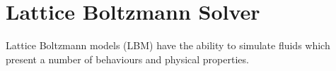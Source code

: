 \section{Lattice Boltzmann Solver}
\label{LBS}

Lattice Boltzmann models (LBM) have the ability to simulate fluids which present a number of behaviours and physical properties. 

